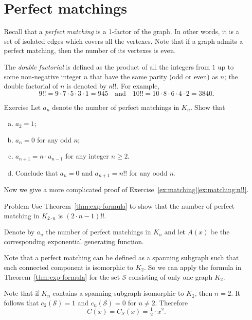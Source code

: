 \section*{Perfect matchings}

Recall that a \emph{perfect matching} is a 1-factor of the graph. 
In other words, it is a set of isolated edges which covers all the vertexes.
Note that if a graph admits a perfect matching, then the number of its vertexes is even.

The \emph{double factorial} is defined as the product of all the integers from $1$ up to some non-negative integer $n$ that have the same parity (odd or even) as $n$;
the double factorial of $n$ is denoted by $n!!$.
For example, 
\[9!! = 9\cdot 7 \cdot 5 \cdot 3 \cdot  1 = 945
\quad\text{and}\quad
10!!=10\cdot8\cdot6\cdot4\cdot2=3840.
\]

\begin{thm}{Exercise}\label{ex:matching}
Let $a_n$ denote the number of perfect matchings in $K_n$.
Show that 
\begin{enumerate}[(a)]
 \item $a_2=1$;
 \item $a_n=0$ for any odd $n$;
 \item\label{ex:matching:recursion} $a_{n+1}=n\cdot a_{n-1}$ for any integer $n\ge 2$.
 \item\label{ex:matching:n!!} 
 Conclude that $a_n=0$ and $a_{n+1}=n!!$ for any oodd $n$.
\end{enumerate}

\end{thm}

Now we give a more complicated proof of Exercise~\ref{ex:matching}\ref{ex:matching:n!!}.

\begin{thm}{Problem}
Use Theorem~\ref{thm:exp-formula} to show that the number of perfect matching in $K_{2\cdot n}$ is $(2\cdot n-1)!!$.
\end{thm}

Denote by $a_n$ the number of perfect matchings in $K_{n}$ and let $A(x)$ be the corresponding exponential generating function.

Note that a perfect matching can be defined as a spanning subgraph such that each connected component is isomorphic to $K_2$.
So we can apply the formula in Theorem~\ref{thm:exp-formula} for the set $\mathcal{S}$ consisting of only one graph $K_2$.

Note that if $K_n$ contains a spanning subgraph isomorphic to $K_2$,
then $n=2$.
It follows that $c_2(\mathcal{S})=1$ and $c_n(\mathcal{S})=0$ for $n\ne 2$.
Therefore 
\[C(x)=C_{\mathcal{S}}(x)=\tfrac12\cdot x^2.\]

